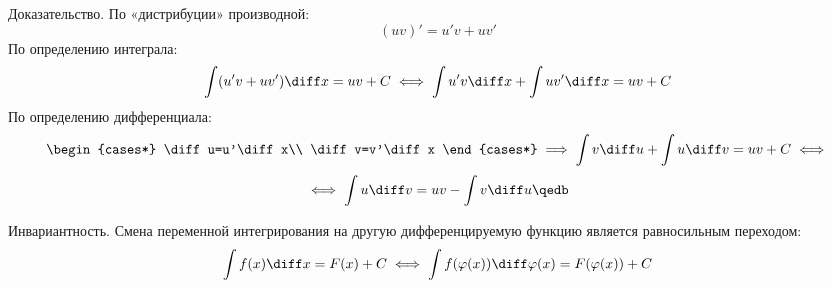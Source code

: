 {\bold Доказательство.} По «дистрибуции» производной:
$$(uv)'=u'v+uv'$$
По определению интеграла:
$$\int(u'v+uv')\diff x=uv+C\iff\int u'v\diff x+\int uv'\diff x=uv+C$$
По определению дифференциала:
$$\begin{cases*}
\diff u=u'\diff x\\
\diff v=v'\diff x
\end{cases*}\implies
\int v\diff u+\int u\diff v=uv+C\iff$$
$$\iff\int u\diff v=uv-\int v\diff u\qedb$$
\begin{theorem}
{\bold Инвариантность.} Смена переменной интегрирования на другую дифференцируемую функцию является {\ital равносильным} переходом:
$$\int f(x)\diff x=F(x)+C\iff\int f(\varphi(x))\diff\varphi(x)=F(\varphi(x))+C$$
\end{theorem}
